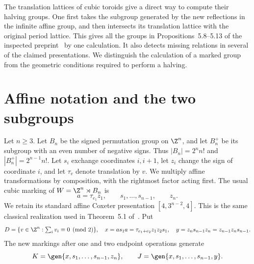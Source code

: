 The translation lattices of cubic toroids give a direct way to compute
their halving groups. One first takes the subgroup generated by the
new reflections in the infinite affine group, and then intersects its
translation lattice with the original period lattice. This gives all
the groups in Propositions~5.8--5.13 of the inspected preprint~\cite{PT}
by one calculation. It also detects missing relations in several of
the claimed presentations. We distinguish the calculation of a marked
group from the geometric conditions required to perform a halving.

\section{Affine notation and the two subgroups}
Let $n\ge3$. Let $B_n$ be the signed permutation group on $\Z^n$,
and let $B_n^+$ be its subgroup with an even number of negative signs.
Thus $|B_n|=2^nn!$ and $|B_n^+|=2^{n-1}n!$.
Let $s_i$ exchange coordinates $i,i+1$, let $z_i$ change the sign
of coordinate $i$, and let $\tau_v$ denote translation by $v$.
We multiply affine transformations by composition, with the rightmost
factor acting first. The usual cubic marking of
$W=\Z^n\rtimes B_n$ is
\[
 a=\tau_{e_1}z_1,\qquad s_1,\ldots,s_{n-1},\qquad z_n.
\]
We retain its standard affine Coxeter presentation
$[4,3^{n-2},4]$. This is the same classical realization used in
Theorem~5.1 of~\cite{PT}. Put
\[
 D=\{v\in\Z^n:\textstyle\sum_i v_i\equiv0\pmod2\},\quad
 x=as_1a=\tau_{e_1+e_2}z_1z_2s_1,\quad
 y=z_ns_{n-1}z_n=z_{n-1}z_ns_{n-1}.
\]
The new markings after one and two endpoint operations generate
\[
 K=\gen{x,s_1,\ldots,s_{n-1},z_n},\qquad
 J=\gen{x,s_1,\ldots,s_{n-1},y}.
\]

